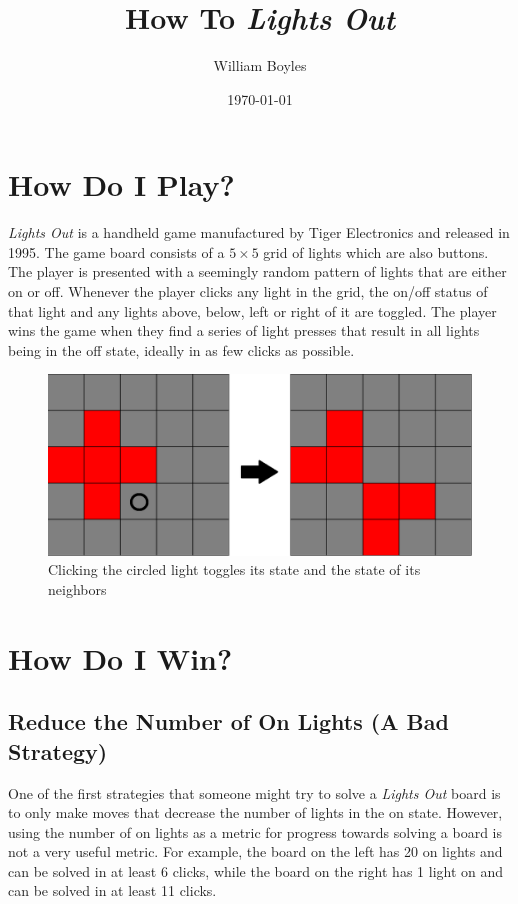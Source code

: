 \documentclass[a4paper]{article}
\begin{document}
	\title{How To \textit{Lights Out}}
	\author{William Boyles}
	\date{\today}
	\maketitle
	
	\section{How Do I Play?}
	\textit{Lights Out} is a handheld game manufactured by Tiger Electronics and released in 1995.
	The game board consists of a $5 \times 5$ grid of lights which are also buttons.
	The player is presented with a seemingly random pattern of lights that are either on or off.
	Whenever the player clicks any light in the grid, the on/off status of that light and any lights above, below, left or right of it are toggled.
	The player wins the game when they find a series of light presses that result in all lights being in the off state, ideally in as few clicks as possible.
	
	\begin{figure}[H]
		\centering
		\includegraphics[width=\textwidth]{board0.png}
		\caption{Clicking the circled light toggles its state and the state of its neighbors}
	\end{figure}

	\section{How Do I Win?}
	\subsection{Reduce the Number of On Lights (A Bad Strategy)}
	One of the first strategies that someone might try to solve a \textit{Lights Out} board is to only make moves that decrease the number of lights in the on state.
	However, using the number of on lights as a metric for progress towards solving a board is not a very useful metric.
	For example, the board on the left has 20 on lights and can be solved in at least 6 clicks, while the board on the right has 1 light on and can be solved in at least 11 clicks.
	
\end{document}
